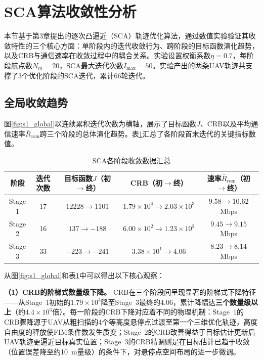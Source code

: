 \section{SCA算法收敛性分析}

本节基于第3章提出的逐次凸逼近（SCA）轨迹优化算法，通过数值实验验证其收敛特性的三个核心方面：单阶段内的迭代收敛行为、跨阶段的目标函数演化趋势，以及CRB与通信速率在收敛过程中的耦合关系。实验设置权衡系数$\eta=0.7$，每阶段航点数$N_m=20$，SCA最大迭代次数$I_{\max}=50$。实验产出的两条UAV轨迹共支撑了3个优化阶段的SCA迭代，累计66轮迭代。

\subsection{全局收敛趋势}

图\ref{fig:s1_global}以连续累积迭代次数为横轴，展示了目标函数$J$、CRB以及平均通信速率$\bar{R}_{\text{com}}$跨三个阶段的总体演化趋势。表\ref{tab:sca_stages}汇总了各阶段首末迭代的关键指标数值。

\begin{table}[htbp]
\centering
\caption{SCA各阶段收敛数据汇总}
\label{tab:sca_stages}
\begin{tabular}{ccccc}
\toprule
阶段 & 迭代次数 & 目标函数$J$（初$\rightarrow$终） & CRB（初$\rightarrow$终） & 速率$\bar{R}_{\text{com}}$（初$\rightarrow$终） \\
\midrule
Stage 1 & 17 & $12228\rightarrow1101$ & $1.79\times10^{4}\rightarrow2.03\times10^{3}$ & $9.58\rightarrow10.62$ Mbps \\
Stage 2 & 16 & $137\rightarrow-188$ & $6.00\times10^{2}\rightarrow1.23\times10^{2}$ & $9.45\rightarrow9.15$ Mbps \\
Stage 3 & 33 & $-223\rightarrow-241$ & $3.38\times10^{1}\rightarrow4.06$ & $8.23\rightarrow8.14$ Mbps \\
\bottomrule
\end{tabular}
\end{table}

从图\ref{fig:s1_global}和表\ref{tab:sca_stages}中可以得出以下核心观察：

\textbf{（1）CRB的阶梯式数量级下降。}
CRB在三个阶段间呈现显著的阶梯式下降特征——从Stage~1初始的$1.79\times10^{4}$降至Stage~3最终的$4.06$，累计降幅达\textbf{三个数量级以上}（约$4.4\times10^{3}$倍）。每一阶段的CRB下降对应着不同的物理机制：Stage~1的CRB骤降源于UAV从粗扫描的4个等高度悬停点过渡至第一个三维优化轨迹，高度自由度的释放使FIM条件数发生质变；Stage~2的CRB改善得益于目标估计更新后UAV轨迹更逼近目标真实位置；Stage~3的CRB精调则是在目标估计已趋于收敛（位置误差降至约10~m量级）的条件下，对悬停点空间布局的进一步微调。

